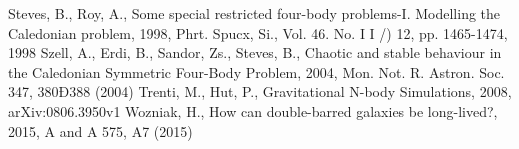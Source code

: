 \documentclass[a4paper,12pt]{article}
\begin{document}
\begin{thebibliography}{1}
Steves, B., Roy, A., Some special restricted four-body problems-I. Modelling the Caledonian problem, 1998, Phrt. Spucx, Si., Vol. 46. No. I I /) 12, pp. 1465-1474, 1998
Szell, A., Erdi, B., Sandor, Zs., Steves, B., Chaotic and stable behaviour in the Caledonian Symmetric Four-Body Problem, 2004, Mon. Not. R. Astron. Soc. 347, 380Ð388 (2004)
Trenti, M., Hut, P., Gravitational N-body Simulations, 2008, arXiv:0806.3950v1
Wozniak, H., How can double-barred galaxies be long-lived?, 2015, A and A 575, A7 (2015)
\end{thebibliography}
\end{document}
